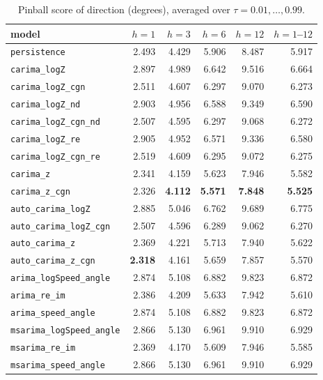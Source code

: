 \documentclass[11pt,a4paper]{article}
\newcommand{\1}{\mathbf{1}}
\begin{document}
\begin{table}[H]
  \centering
  \caption{Pinball score of direction (degrees), averaged over $\tau = 0.01, \dots, 0.99$.}\label{tab:pinball-angle}
  \begin{tabular}{lrrrrr}
    \toprule
    model & $h=1$ & $h=3$ & $h=6$ & $h=12$ & $h=1$--$12$ \\
    \midrule
\texttt{persistence} & 2.493 & 4.429 & 5.906 & 8.487 & 5.917 \\ \midrule
\texttt{carima\_logZ} & 2.897 & 4.989 & 6.642 & 9.516 & 6.664 \\
\texttt{carima\_logZ\_cgn} & 2.511 & 4.607 & 6.297 & 9.070 & 6.273 \\
\texttt{carima\_logZ\_nd} & 2.903 & 4.956 & 6.588 & 9.349 & 6.590 \\
\texttt{carima\_logZ\_cgn\_nd} & 2.507 & 4.595 & 6.297 & 9.068 & 6.272 \\
\texttt{carima\_logZ\_re} & 2.905 & 4.952 & 6.571 & 9.336 & 6.580 \\
\texttt{carima\_logZ\_cgn\_re} & 2.519 & 4.609 & 6.295 & 9.072 & 6.275 \\
\texttt{carima\_z} & 2.341 & 4.159 & 5.623 & 7.946 & 5.582 \\
\texttt{carima\_z\_cgn} & 2.326 & \textbf{4.112} & \textbf{5.571} & \textbf{7.848} & \textbf{5.525} \\ \midrule
\texttt{auto\_carima\_logZ} & 2.885 & 5.046 & 6.762 & 9.689 & 6.775 \\
\texttt{auto\_carima\_logZ\_cgn} & 2.507 & 4.596 & 6.289 & 9.062 & 6.270 \\
\texttt{auto\_carima\_z} & 2.369 & 4.221 & 5.713 & 7.940 & 5.622 \\
\texttt{auto\_carima\_z\_cgn} & \textbf{2.318} & 4.161 & 5.659 & 7.857 & 5.570 \\ \midrule
\texttt{arima\_logSpeed\_angle} & 2.874 & 5.108 & 6.882 & 9.823 & 6.872 \\
\texttt{arima\_re\_im} & 2.386 & 4.209 & 5.633 & 7.942 & 5.610 \\
\texttt{arima\_speed\_angle} & 2.874 & 5.108 & 6.882 & 9.823 & 6.872 \\
\texttt{msarima\_logSpeed\_angle} & 2.866 & 5.130 & 6.961 & 9.910 & 6.929 \\
\texttt{msarima\_re\_im} & 2.369 & 4.170 & 5.609 & 7.946 & 5.585 \\
\texttt{msarima\_speed\_angle} & 2.866 & 5.130 & 6.961 & 9.910 & 6.929 \\
    \bottomrule
  \end{tabular}
\end{table}
\end{document}
